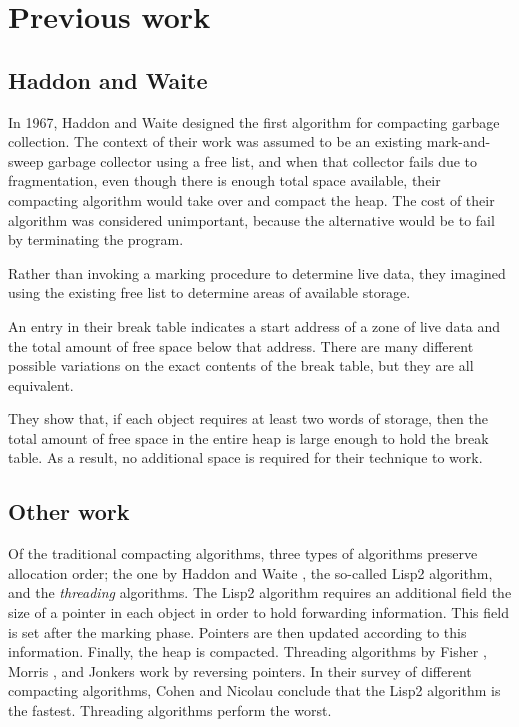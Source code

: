 \section{Previous work}

\subsection{Haddon and Waite}

In 1967, Haddon and Waite \cite{Haddon:1967} designed the first
algorithm for compacting garbage collection.  The context of their
work was assumed to be an existing mark-and-sweep garbage collector
using a free list, and when that collector fails due to fragmentation,
even though there is enough total space available, their compacting
algorithm would take over and compact the heap.  The cost of their
algorithm was considered unimportant, because the alternative would be
to fail by terminating the program.

Rather than invoking a marking procedure to determine live data, they
imagined using the existing free list to determine areas of available
storage. 

An entry in their break table indicates a start address of a zone of
live data and the total amount of free space below that address.
There are many different possible variations on the exact contents of
the break table, but they are all equivalent.

They show that, if each object requires at least two words of storage,
then the total amount of free space in the entire heap is large enough
to hold the break table.  As a result, no additional space is
required for their technique to work.

\subsection{Other work}

Of the traditional compacting algorithms, three types of algorithms
preserve allocation order; the one by Haddon and Waite
\cite{Haddon:1967}, the so-called Lisp2 algorithm, and the
\emph{threading} algorithms.  The Lisp2 algorithm requires an
additional field the size of a pointer in each object in order to hold
forwarding information.  This field is set after the marking phase.
Pointers are then updated according to this information.  Finally, the
heap is compacted.  Threading algorithms by Fisher \cite{fish74},
Morris \cite{morr78}, and Jonkers \cite{jonk79} work by reversing
pointers.  In their survey of different compacting algorithms, Cohen
and Nicolau \cite{Cohen:1983:CCA:69575.357226} conclude that the Lisp2
algorithm is the fastest.  Threading algorithms perform the worst.

